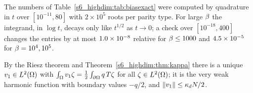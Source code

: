 \noindent The numbers of Table~\ref{s6_highdim:tab:biasexact} were computed by quadrature in $t$
over $[10^{-11},80]$ with $2\times10^5$ roots per parity type. For large $\beta$ the integrand, in
$\log t$, decays only like $t^{1/2}$ as $t\to0$; a check over $[10^{-18},400]$ changes the entries by
at most $1.0\times 10^{-8}$ relative for $\beta\le1000$ and $4.5\times 10^{-5}$ for $\beta=10^4,10^5$.

By the Riesz theorem and Theorem~\ref{s6_highdim:thm:kappa} there is a unique $v_1\in L^2(\Omega)$ with
$\int_\Omega v_1\zeta=\frac12\int_{\partial\Omega}q\,T\zeta$ for all $\zeta\in L^2(\Omega)$; it is the very weak
harmonic function with boundary values $-q/2$, and $\lVert v_1\rVert\le\kappa_dN/2$.

